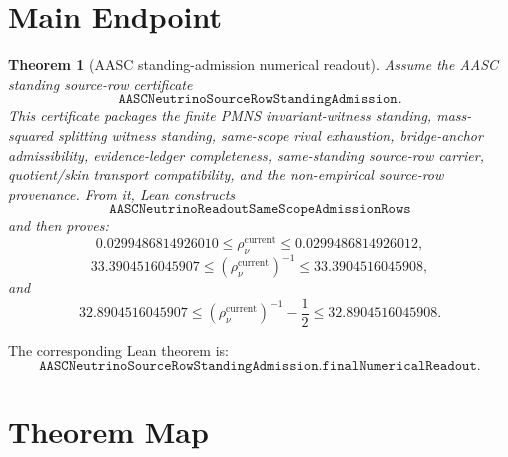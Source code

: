 \documentclass[11pt]{article}
\newtheorem{theorem}{Theorem}
\begin{document}
\section{Main Endpoint}

\begin{theorem}[AASC standing-admission numerical readout]
Assume the AASC standing source-row certificate
\[
  \texttt{AASCNeutrinoSourceRowStandingAdmission}.
\]
This certificate packages the finite PMNS invariant-witness standing,
mass-squared splitting witness standing, same-scope rival exhaustion,
bridge-anchor admissibility, evidence-ledger completeness, same-standing
source-row carrier, quotient/skin transport compatibility, and the
non-empirical source-row provenance.  From it, Lean constructs
\[
  \texttt{AASCNeutrinoReadoutSameScopeAdmissionRows}
\]
and then proves:
\[
  0.0299486814926010
  \leq \rho_{\nu}^{\mathrm{current}}
  \leq
  0.0299486814926012,
\]
\[
  33.3904516045907
  \leq
  \left(\rho_{\nu}^{\mathrm{current}}\right)^{-1}
  \leq
  33.3904516045908,
\]
and
\[
  32.8904516045907
  \leq
  \left(\rho_{\nu}^{\mathrm{current}}\right)^{-1} - \frac{1}{2}
  \leq
  32.8904516045908.
\]
\end{theorem}

The corresponding Lean theorem is:
\[
  \texttt{AASCNeutrinoSourceRowStandingAdmission.finalNumericalReadout}.
\]

\section{Theorem Map}
\end{document}
